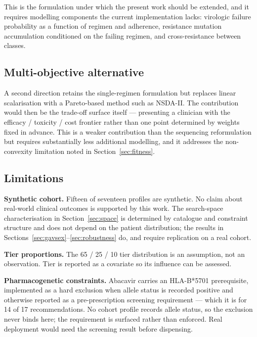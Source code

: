\documentclass[conference]{IEEEtran}
\begin{document}
This is the formulation under which the present work should be extended, and it requires modelling components the current implementation lacks: virologic failure probability as a function of regimen and adherence, resistance mutation accumulation conditioned on the failing regimen, and cross-resistance between classes.

\subsection{Multi-objective alternative}\label{sec:multiobj}

A second direction retains the single-regimen formulation but replaces linear scalarisation with a Pareto-based method such as NSDA-II. The contribution would then be the trade-off surface itself --- presenting a clinician with the efficacy / toxicity / cost frontier rather than one point determined by weights fixed in advance. This is a weaker contribution than the sequencing reformulation but requires substantially less additional modelling, and it addresses the non-convexity limitation noted in Section~\ref{sec:fitness}.

\subsection{Limitations}\label{sec:limitations}

\textbf{Synthetic cohort.} Fifteen of seventeen profiles are synthetic. No claim about real-world clinical outcomes is supported by this work. The search-space characterisation in Section~\ref{sec:space} is determined by catalogue and constraint structure and does not depend on the patient distribution; the results in Sections~\ref{sec:gavsex}--\ref{sec:robustness} do, and require replication on a real cohort.

\textbf{Tier proportions.} The 65 / 25 / 10 tier distribution is an assumption, not an observation. Tier is reported as a covariate so its influence can be assessed.

\textbf{Pharmacogenetic constraints.} Abacavir carries an HLA-B*5701 prerequisite, implemented as a hard exclusion when allele status is recorded positive and otherwise reported as a pre-prescription screening requirement --- which it is for 14 of 17 recommendations. No cohort profile records allele status, so the exclusion never binds here; the requirement is surfaced rather than enforced. Real deployment would need the screening result before dispensing.
\end{document}
